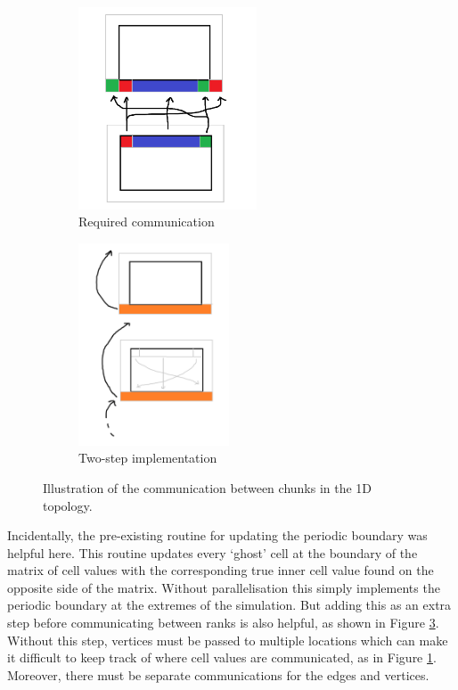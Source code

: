 \documentclass[12pt]{article}
\begin{document}
\begin{figure}[hp]
    \begin{subfigure}{0.49\textwidth}
    \includegraphics[width=0.9\linewidth, height=6cm, center]{figures/domain_decomp_1d_1.png}
    \caption{Required communication}
    \label{fig:domain_1d_1}
    \end{subfigure}
    \begin{subfigure}{0.49\textwidth}
    \includegraphics[width=0.9\linewidth, height=6cm, center]{figures/domain_decomp_1d_2.png}
    \caption{Two-step implementation}
    \label{fig:domain_1d_2}
    \end{subfigure}

    \caption{Illustration of the communication between chunks in the 1D topology.}
    \label{fig:domain_1d}
\end{figure}

Incidentally, the pre-existing routine for updating the periodic boundary was helpful here.
This routine updates every `ghost' cell at the boundary of the matrix of cell values with the corresponding true inner cell value found on the opposite side of the matrix.
Without parallelisation this simply implements the periodic boundary at the extremes of the simulation.
But adding this as an extra step before communicating between ranks is also helpful, as shown in Figure \ref{fig:domain_1d}.
Without this step, vertices must be passed to multiple locations which can make it difficult to keep track of where cell values are communicated, as in Figure \ref{fig:domain_1d_1}.
Moreover, there must be separate communications for the edges and vertices.
\end{document}

